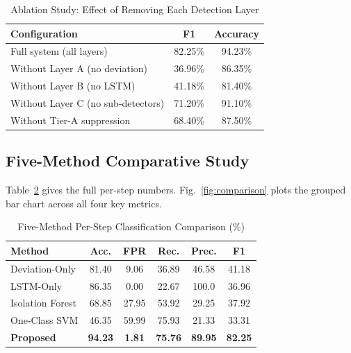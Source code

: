 \documentclass[conference,a4paper]{IEEEtran}
\begin{document}
\begin{table}[htbp]
\caption{Ablation Study: Effect of Removing Each Detection Layer}
\begin{center}
\begin{tabular}{|l|c|c|}
\hline
\textbf{Configuration} & \textbf{F1} & \textbf{Accuracy} \\
\hline
Full system (all layers) & 82.25\% & 94.23\% \\
\hline
Without Layer A (no deviation) & 36.96\% & 86.35\% \\
\hline
Without Layer B (no LSTM) & 41.18\% & 81.40\% \\
\hline
Without Layer C (no sub-detectors) & 71.20\% & 91.10\% \\
\hline
Without Tier-A suppression & 68.40\% & 87.50\% \\
\hline
\end{tabular}
\label{tab:ablation}
\end{center}
\end{table}

\subsection{Five-Method Comparative Study}

Table~\ref{tab:fivemethod} gives the full per-step numbers. Fig.~\ref{fig:comparison} plots the grouped bar chart across all four key metrics.

\begin{table}[htbp]
\caption{Five-Method Per-Step Classification Comparison (\%)}
\begin{center}
\begin{tabular}{|l|c|c|c|c|c|}
\hline
\textbf{Method} & \textbf{Acc.} & \textbf{FPR} & \textbf{Rec.} & \textbf{Prec.} & \textbf{F1} \\
\hline
Deviation-Only & 81.40 & 9.06 & 36.89 & 46.58 & 41.18 \\
\hline
LSTM-Only & 86.35 & 0.00 & 22.67 & 100.0 & 36.96 \\
\hline
Isolation Forest & 68.85 & 27.95 & 53.92 & 29.25 & 37.92 \\
\hline
One-Class SVM & 46.35 & 59.99 & 75.93 & 21.33 & 33.31 \\
\hline
\textbf{Proposed} & \textbf{94.23} & \textbf{1.81} & \textbf{75.76} & \textbf{89.95} & \textbf{82.25} \\
\hline
\end{tabular}
\label{tab:fivemethod}
\end{center}
\end{table}
\end{document}
